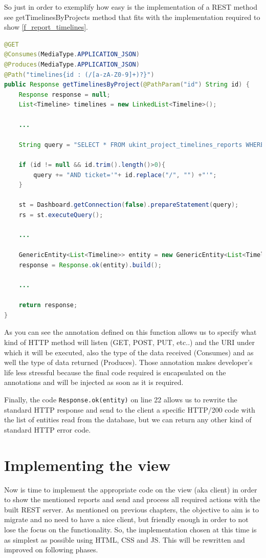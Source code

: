 So just in order to exemplify how easy is the implementation of a REST method
see getTimelinesByProjects method that fits with the implementation required to
show \ref{f_report_timelines}.\\

\begin{lstlisting}[language=Java,breaklines=true,caption=Reports.getTimelinesByProjects(),label=f_migration_gettimelines]
@GET
@Consumes(MediaType.APPLICATION_JSON)
@Produces(MediaType.APPLICATION_JSON)
@Path("timelines{id : (/[a-zA-Z0-9]+)?}")
public Response getTimelinesByProject(@PathParam("id") String id) {
	Response response = null;
	List<Timeline> timelines = new LinkedList<Timeline>(); 

	...
	
	String query = "SELECT * FROM ukint_project_timelines_reports WHERE 1 ";

	if (id != null && id.trim().length()>0){
		query += "AND ticket='"+ id.replace("/", "") +"'";
	}
	
	st = Dashboard.getConnection(false).prepareStatement(query);
	rs = st.executeQuery();
	
	...
	
	GenericEntity<List<Timeline>> entity = new GenericEntity<List<Timeline>>(timelines) {};
	response = Response.ok(entity).build();
	
	...
	
	return response;
}
\end{lstlisting}

As you can see the annotation defined on this function allows us to specify what
kind of HTTP method will listen (GET, POST, PUT, etc..) and the URI under which
it will be executed, also the type of the data received (Consumes) and as well
the type of data returned (Produces). Those annotation makes developer's
life less stressful because the final code required is encapsulated on the
annotations and will be injected as soon as it is required.

Finally, the code \texttt{Response.ok(entity)} on line 22 allows us to rewrite
the standard HTTP response and send to the client a specific HTTP/200 code with the
list of entities read from the database, but we can return any other kind of
standard HTTP error code.

\section{Implementing the view}
Now is time to implement the appropriate code on the view (aka client) in order
to show the mentioned reports and send and process all required actions with
the built REST server. As mentioned on previous chapters, the objective to aim
is to migrate and no need to have a nice client, but friendly enough in order to
not lose the focus on the functionality. So, the implementation chosen at this
time is as simplest as possible using HTML, CSS and JS. This will be rewritten
and improved on following phases.

